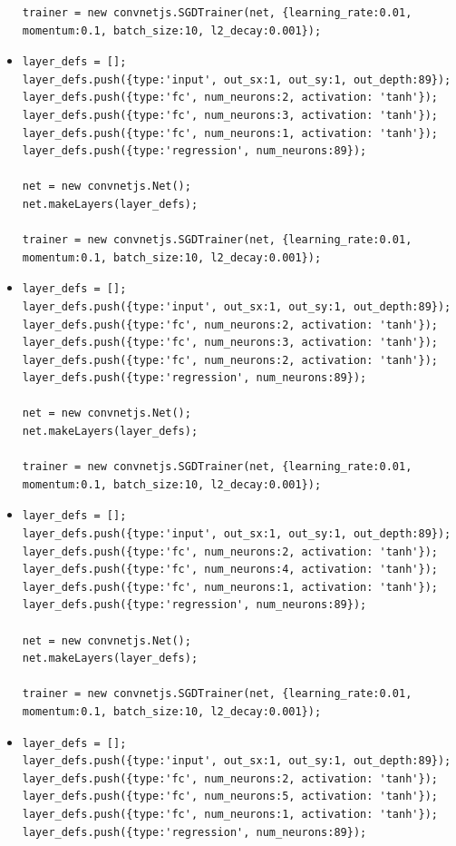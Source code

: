 \begin{itemize}
\begin{verbatim}
trainer = new convnetjs.SGDTrainer(net, {learning_rate:0.01, 
momentum:0.1, batch_size:10, l2_decay:0.001});
\end{verbatim}


\item \begin{verbatim}
layer_defs = [];
layer_defs.push({type:'input', out_sx:1, out_sy:1, out_depth:89});
layer_defs.push({type:'fc', num_neurons:2, activation: 'tanh'});
layer_defs.push({type:'fc', num_neurons:3, activation: 'tanh'});
layer_defs.push({type:'fc', num_neurons:1, activation: 'tanh'});
layer_defs.push({type:'regression', num_neurons:89});

net = new convnetjs.Net();
net.makeLayers(layer_defs);

trainer = new convnetjs.SGDTrainer(net, {learning_rate:0.01, 
momentum:0.1, batch_size:10, l2_decay:0.001});
\end{verbatim}


\item \begin{verbatim}
layer_defs = [];
layer_defs.push({type:'input', out_sx:1, out_sy:1, out_depth:89});
layer_defs.push({type:'fc', num_neurons:2, activation: 'tanh'});
layer_defs.push({type:'fc', num_neurons:3, activation: 'tanh'});
layer_defs.push({type:'fc', num_neurons:2, activation: 'tanh'});
layer_defs.push({type:'regression', num_neurons:89});

net = new convnetjs.Net();
net.makeLayers(layer_defs);

trainer = new convnetjs.SGDTrainer(net, {learning_rate:0.01, 
momentum:0.1, batch_size:10, l2_decay:0.001});
\end{verbatim}


\item \begin{verbatim}
layer_defs = [];
layer_defs.push({type:'input', out_sx:1, out_sy:1, out_depth:89});
layer_defs.push({type:'fc', num_neurons:2, activation: 'tanh'});
layer_defs.push({type:'fc', num_neurons:4, activation: 'tanh'});
layer_defs.push({type:'fc', num_neurons:1, activation: 'tanh'});
layer_defs.push({type:'regression', num_neurons:89});

net = new convnetjs.Net();
net.makeLayers(layer_defs);

trainer = new convnetjs.SGDTrainer(net, {learning_rate:0.01, 
momentum:0.1, batch_size:10, l2_decay:0.001});
\end{verbatim}

\item \begin{verbatim}
layer_defs = [];
layer_defs.push({type:'input', out_sx:1, out_sy:1, out_depth:89});
layer_defs.push({type:'fc', num_neurons:2, activation: 'tanh'});
layer_defs.push({type:'fc', num_neurons:5, activation: 'tanh'});
layer_defs.push({type:'fc', num_neurons:1, activation: 'tanh'});
layer_defs.push({type:'regression', num_neurons:89});


\end{verbatim}
\end{itemize}
